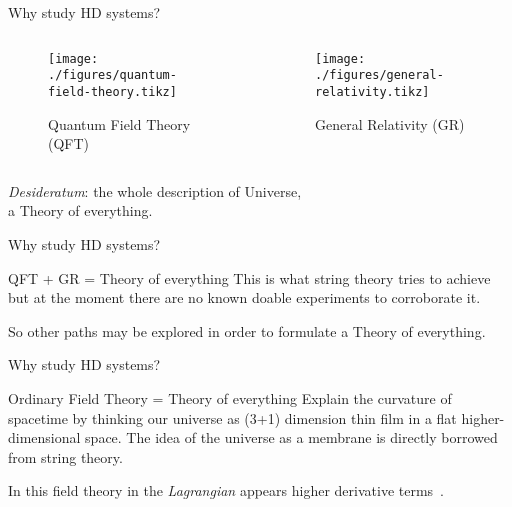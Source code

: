 \begin{frame}{Why study HD systems?}
  \begin{columns}
    \begin{column}{0.5\textwidth}
      \begin{figure}
        \texttt{[image: ./figures/quantum-field-theory.tikz]}
        \caption[labelformat=empty]{Quantum Field Theory (QFT)}\label{fig:QFT}
      \end{figure}
    \end{column}
    \begin{column}{0.5\textwidth}
      \begin{figure}
        \texttt{[image: ./figures/general-relativity.tikz]}
        \caption[labelformat=empty]{General Relativity (GR)}\label{fig:GR}
      \end{figure}
    \end{column}
  \end{columns}
  \vspace{1em}
  \begin{center}
    \emph{Desideratum}: the whole description of Universe, \\
    a \alert{Theory of everything}.
  \end{center}
\end{frame}

\begin{frame}{Why study HD systems?}
  \begin{alertblock}{QFT + GR = Theory of everything}
      \vspace{0.5em}
      This is what string theory tries to achieve but at the moment there are
      no known doable experiments to corroborate it.
  \end{alertblock}
  So other paths may be explored in order to formulate a Theory of everything.
\end{frame}

\begin{frame}{Why study HD systems?}
  \begin{alertblock}{Ordinary Field Theory = Theory of everything}
    \vspace{0.5em}
      Explain the curvature of spacetime by thinking our universe as (3+1)
      dimension thin film in a flat higher-dimensional space. The idea of the
      universe as a membrane is directly borrowed from string theory.
  \end{alertblock}
  In this field theory in the \emph{Lagrangian} appears \alert{higher
  derivative terms}~\cite{Smilga17}.
\end{frame}

